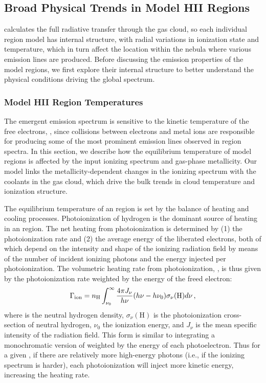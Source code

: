 \subsection{Broad Physical Trends in Model HII Regions}\label{sec:models:broad}

\Cloudy calculates the full radiative transfer through the gas cloud, so each individual \hii region model has internal structure, with radial variations in ionization state and temperature, which in turn affect the location within the nebula where various emission lines are produced. Before discussing the emission properties of the model \hii regions, we first explore their internal structure to better understand the physical conditions driving the global spectrum.

\subsubsection{Model HII Region Temperatures}\label{sec:models:broad:temp}

The emergent emission spectrum is sensitive to the kinetic temperature of the free electrons, \Te{}, since collisions between electrons and metal ions are responsible for producing some of the most prominent emission lines observed in \hii region spectra. In this section, we describe how the equilibrium temperature of model \hii regions is affected by the input ionizing spectrum and gas-phase metallicity. Our model links the metallicity-dependent changes in the ionizing spectrum with the coolants in the gas cloud, which drive the bulk trends in cloud temperature and ionization structure.

The equilibrium temperature of an \hii region is set by the balance of heating and cooling processes. Photoionization of hydrogen is the dominant source of heating in an \hii region. The net heating from photoionization is determined by (1) the photoionization rate and (2) the average energy of the liberated electrons, both of which depend on the intensity and shape of the ionizing radiation field by means of the number of incident ionizing photons and the energy injected per photoionization. The volumetric heating rate from photoionization, \Heat{}, is thus given by the photoionization rate weighted by the energy of the freed electron:
\begin{equation}\label{eq:heat}
    \Gamma_{\mathrm{ion}} = n_{\mathrm{H}}{} \int_{\nu_0}^{\infty} \frac{4 \pi J_{\nu}}{h\nu} (h \nu - h \nu_0) \sigma_{\nu}(\mathrm{H}) d\nu \,,
\end{equation}
where \nH{} is the neutral hydrogen density, $\sigma_{\nu}(\mathrm{H})$ is the photoionization cross-section of neutral hydrogen, $\nu_0$ the ionization energy,  and $J_{\nu}$ is the mean specific intensity of the radiation field. This form is similar to integrating a monochromatic version of \QH{} weighted by the energy of each photoelectron. Thus for a given \QH{}, if there are relatively more high-energy photons (i.e., if the ionizing spectrum is harder), each photoionization will inject more kinetic energy, increasing the heating rate.

